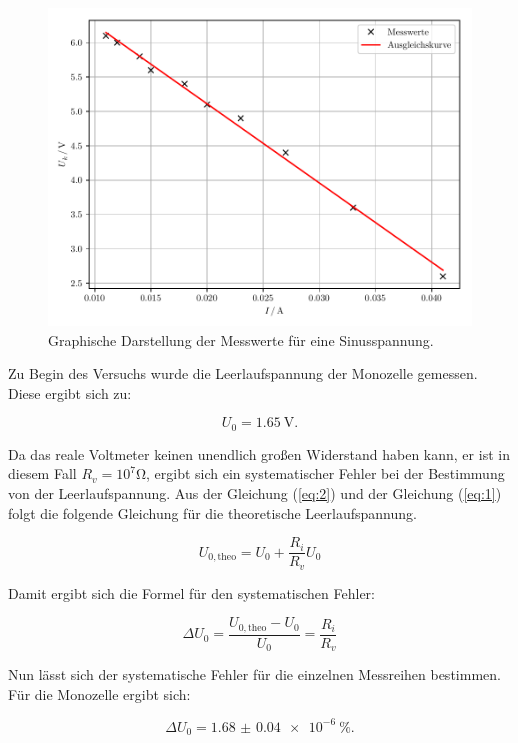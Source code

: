 \begin{figure}[H]
  \centering
  \includegraphics{plot4.pdf}
  \caption{Graphische Darstellung der Messwerte für eine Sinusspannung.}
  \label{abb:7}
\end{figure}


Zu Begin des Versuchs wurde die Leerlaufspannung der Monozelle gemessen. Diese ergibt sich
zu:

\begin{equation*}
  U_0 = \SI{1.65}{\volt}.
\end{equation*}

Da das reale Voltmeter keinen unendlich großen Widerstand haben kann, er ist in diesem
Fall $R_v = 10^7 \si{\ohm}$, ergibt sich ein systematischer Fehler bei der Bestimmung
von der Leerlaufspannung. Aus der Gleichung (\ref{eq:2}) und der Gleichung (\ref{eq:1})
folgt die folgende Gleichung für die theoretische Leerlaufspannung.

\begin{equation*}
  U_{0,\text{theo}} = U_0 + \frac{R_i}{R_v} U_0
\end{equation*}

Damit ergibt sich die Formel für den systematischen Fehler:

\begin{equation*}
  \Delta U_0 = \frac{U_{0,\text{theo}} - U_0}{U_0} = \frac{R_i}{R_v}
\end{equation*}

Nun lässt sich der systematische Fehler für die einzelnen Messreihen bestimmen.
Für die Monozelle ergibt sich:

\begin{equation*}
  \Delta U_0 = \SI{1.68(4)e-6}{\percent}.
\end{equation*}

